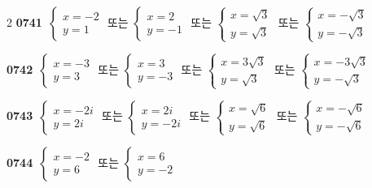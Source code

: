 \documentclass[10pt,a4paper]{article}
\begin{document}
\begin{multicols}{2}
\noindent\textbf{0741}\ $\begin{cases} x=-2 \\ y=1 \end{cases}$ 또는 $\begin{cases} x=2 \\ y=-1 \end{cases}$ 또는 $\begin{cases} x=\sqrt{3} \\ y=\sqrt{3} \end{cases}$ 또는 $\begin{cases} x=-\sqrt{3} \\ y=-\sqrt{3} \end{cases}$\par
\noindent\textbf{0742}\ $\begin{cases} x=-3 \\ y=3 \end{cases}$ 또는 $\begin{cases} x=3 \\ y=-3 \end{cases}$ 또는 $\begin{cases} x=3\sqrt{3} \\ y=\sqrt{3} \end{cases}$ 또는 $\begin{cases} x=-3\sqrt{3} \\ y=-\sqrt{3} \end{cases}$\par
\noindent\textbf{0743}\ $\begin{cases} x=-2i \\ y=2i \end{cases}$ 또는 $\begin{cases} x=2i \\ y=-2i \end{cases}$ 또는 $\begin{cases} x=\sqrt{6} \\ y=\sqrt{6} \end{cases}$ 또는 $\begin{cases} x=-\sqrt{6} \\ y=-\sqrt{6} \end{cases}$\par
\noindent\textbf{0744}\ $\begin{cases} x=-2 \\ y=6 \end{cases}$ 또는 $\begin{cases} x=6 \\ y=-2 \end{cases}$\par

\end{multicols}
\end{document}
